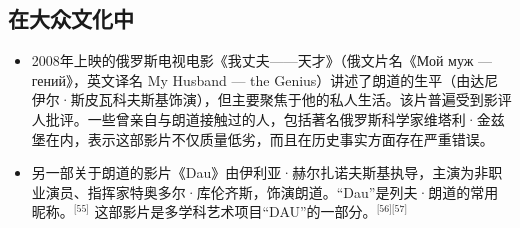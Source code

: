 \subsection{在大众文化中}
\begin{itemize}
\item 2008年上映的俄罗斯电视电影《我丈夫——天才》（俄文片名《Мой муж — гений》，英文译名 My Husband — the Genius）讲述了朗道的生平（由达尼伊尔·斯皮瓦科夫斯基饰演），但主要聚焦于他的私人生活。该片普遍受到影评人批评。一些曾亲自与朗道接触过的人，包括著名俄罗斯科学家维塔利·金兹堡在内，表示这部影片不仅质量低劣，而且在历史事实方面存在严重错误。
\item 另一部关于朗道的影片《Dau》由伊利亚·赫尔扎诺夫斯基执导，主演为非职业演员、指挥家特奥多尔·库伦齐斯，饰演朗道。“Dau”是列夫·朗道的常用昵称。\(^\text{[55]}\)
这部影片是多学科艺术项目“DAU”的一部分。\(^\text{[56][57]}\)
\end{itemize}